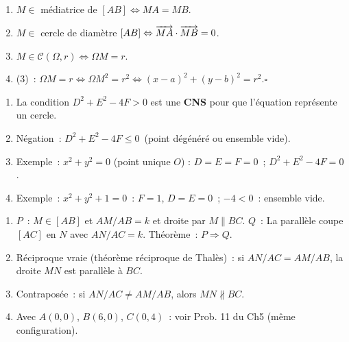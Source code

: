 
\begin{enumerate}
  \item $M\in$ m\'ediatrice de $[AB]\Leftrightarrow MA=MB$.
  \item $M\in$ cercle de diam\`etre $[AB]\Leftrightarrow\overrightarrow{MA}\cdot\overrightarrow{MB}=0$.
  \item $M\in\mathcal{C}(\Omega,r)\Leftrightarrow\Omega M=r$.
  \item (3)~: $\Omega M=r\Leftrightarrow\Omega M^2=r^2\Leftrightarrow(x-a)^2+(y-b)^2=r^2$.\hfill$\square$
\end{enumerate}


\begin{enumerate}
  \item La condition $D^2+E^2-4F>0$ est une \textbf{CNS} pour que l'\'equation repr\'esente un cercle.
  \item N\'egation~: \og $D^2+E^2-4F\leq0$\fg\ (point d\'eg\'en\'er\'e ou ensemble vide).
  \item Exemple~: $x^2+y^2=0$ (point unique $O$) : $D=E=F=0$~; $D^2+E^2-4F=0$.
  \item Exemple~: $x^2+y^2+1=0$~: $F=1$, $D=E=0$~; $-4<0$~: ensemble vide.
\end{enumerate}


\begin{enumerate}
  \item $P$~: \og $M\in[AB]$ et $AM/AB=k$ et droite par $M\parallel BC$\fg.
        $Q$~: \og La parallèle coupe $[AC]$ en $N$ avec $AN/AC=k$.\fg
        Th\'eor\`eme~: $P\Rightarrow Q$.
  \item R\'eciproque vraie (th\'eor\`eme r\'eciproque de Thal\`es)~:
        si $AN/AC=AM/AB$, la droite $MN$ est parall\`ele \`a $BC$.
  \item Contrapos\'ee~: si $AN/AC\ne AM/AB$, alors $MN\not\parallel BC$.
  \item Avec $A(0,0)$, $B(6,0)$, $C(0,4)$~: voir Prob. 11 du Ch5 (m\^eme configuration).
\end{enumerate}


